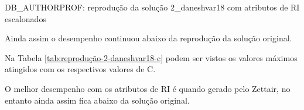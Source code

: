 \documentclass[%
  10pt,%
  aspectratio = 169,%
  compress,%
  t,%
]{beamer}%
\begin{document}
    \begin{frame}{}{DB\_AUTHORPROF: reprodução da solução 2\_daneshvar18 com atributos de RI escalonados}
        
        Ainda assim o desempenho continuou abaixo da reprodução da solução original.

        Na Tabela \ref{tab:reprodução-2-daneshvar18-c} podem ser vistos os valores máximos atingidos com os respectivos valores de C.
        
        

        O melhor desempenho com os atributos de RI é quando gerado pelo Zettair, no entanto ainda assim fica abaixo da solução original.
    \end{frame}
\end{document}
